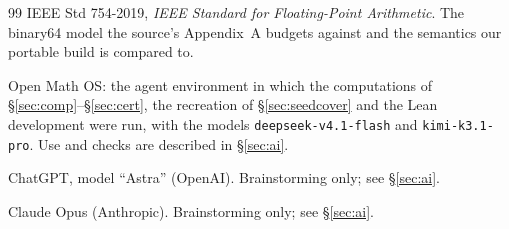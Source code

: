 \documentclass[10pt]{article}
\theoremstyle{definition}
\begin{document}
\begin{thebibliography}{99}
IEEE Std 754-2019, \emph{IEEE Standard for Floating-Point Arithmetic}. The binary64 model the
source's Appendix~A budgets against and the semantics our portable build is compared to.

Open Math OS: the agent environment in which the computations of \S\ref{sec:comp}--\S\ref{sec:cert},
the recreation of \S\ref{sec:seedcover} and the Lean development were run, with the models
\texttt{deepseek-v4.1-flash} and \texttt{kimi-k3.1-pro}. Use and checks are described in
\S\ref{sec:ai}.

ChatGPT, model ``Astra'' (OpenAI). Brainstorming only; see \S\ref{sec:ai}.

Claude Opus (Anthropic). Brainstorming only; see \S\ref{sec:ai}.

\end{thebibliography}
\end{document}
